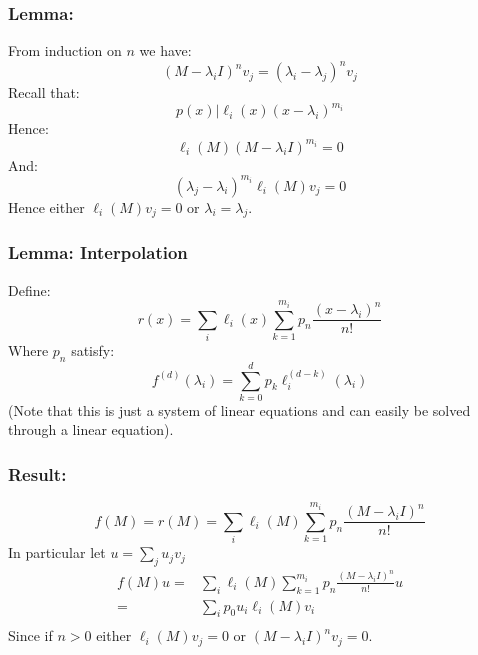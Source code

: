 \subsubsection{Lemma:}
From induction on $n$ we have:
\[(M-\lambda_iI)^nv_j = (\lambda_i-\lambda_j)^nv_j\]
Recall that:
\[p(x) |\ell_i(x)(x-\lambda_i)^{m_i}\]
Hence:
\[\ell_i(M)(M-\lambda_iI)^{m_i} = 0\]
And:
\[(\lambda_j-\lambda_i)^{m_i}\ell_i(M)v_j = 0\]
Hence either $\ell_i(M)v_j =0$ or $\lambda_i=\lambda_j$.
\\

\subsubsection{Lemma: Interpolation}
Define:
\[r(x) = \sum_i\ell_i(x)\sum_{k=1}^{m_i}p_n\frac{(x-\lambda_i)^n}{n!}\]
Where $p_n$ satisfy:
\[f^{(d)}(\lambda_i) = \sum_{k=0}^{d}p_k\ell_i^{(d-k)}(\lambda_i)\]
(Note that this is just a system of linear equations and can easily be solved through a linear equation).

\subsubsection{Result:}
\[f(M) = r(M) = \sum_i\ell_i(M)\sum_{k=1}^{m_i}p_n\frac{(M-\lambda_iI)^n}{n!}\]
In particular let $u=\sum_ju_jv_j$
\begin{equation*}
\begin{aligned}
	f(M)u =& \sum_i\ell_i(M)\sum_{k=1}^{m_i}p_n\frac{(M-\lambda_iI)^n}{n!}u\\
	=& \sum_ip_0u_i\ell_i(M)v_i\\
\end{aligned}
\end{equation*}
Since if $n>0$ either $\ell_i(M)v_j=0$ or $(M-\lambda_iI)^nv_j = 0$.

